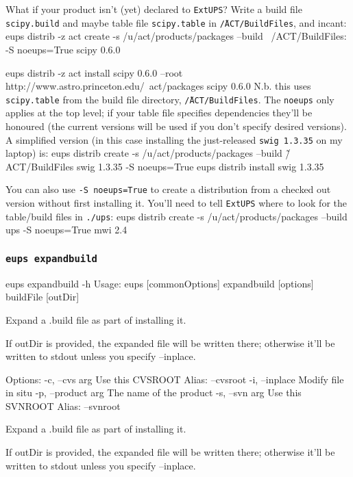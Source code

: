 \documentclass{article}
\newcommand{\code}[1]{\texttt{#1}}
\newcommand{\eups}{\code{ExtUPS}\xspace}
\let\overbatim=\verbatim
\let\oendverbatim=\endverbatim
\renewenvironment{verbatim}
{\center\minipage{16cm}\overbatim}
{\oendverbatim\endminipage\endcenter}
\begin{document}
What if your product isn't (yet) declared to \eups?  Write a build file \code{scipy.build} and
maybe table file \code{scipy.table} in \code{\~/ACT/BuildFiles}, and incant:
\begin{verbatim}
eups distrib -z act create -s /u/act/products/packages --build ~/ACT/BuildFiles: -S noeups=True scipy 0.6.0

eups distrib -z act install scipy 0.6.0 --root http://www.astro.princeton.edu/~act/packages scipy 0.6.0
\end{verbatim}
N.b. this uses \code{scipy.table} from the build file directory, \code{\~/ACT/BuildFiles}. The
\code{noeups} only applies at the top level;  if your table file specifies dependencies
they'll be honoured (the current versions will be used if you don't specify desired versions). A
simplified version (in this case installing the just-released \code{swig 1.3.35} on my laptop) is:
\begin{verbatim}
eups distrib create -s /u/act/products/packages --build \~/ACT/BuildFiles swig 1.3.35 -S noeups=True
eups distrib install swig 1.3.35
\end{verbatim}

You can also use \code{-S noeups=True} to create a distribution from a checked out version without
first installing it.  You'll need to tell \eups where to look for the table/build files
in \code{./ups}:
\begin{verbatim}
eups distrib create -s /u/act/products/packages --build ups -S noeups=True mwi 2.4
\end{verbatim}


\subsubsection{\code{eups expandbuild}}
\begin{verbatim}
eups expandbuild -h
Usage:
    eups [commonOptions] expandbuild [options] buildFile [outDir]

    Expand a .build file as part of installing it.

    If outDir is provided, the expanded file will be written there;
    otherwise it'll be written to stdout unless you specify --inplace.

Options:
   -c, --cvs        arg    Use this CVSROOT
                           Alias: --cvsroot
   -i, --inplace           Modify file in situ
   -p, --product    arg    The name of the product
   -s, --svn        arg    Use this SVNROOT
                           Alias: --svnroot

Expand a .build file as part of installing it.

If outDir is provided, the expanded file will be written there;
otherwise it'll be written to stdout unless you specify --inplace.
\end{verbatim}
\end{document}
